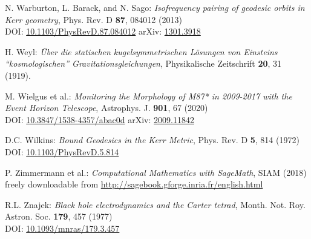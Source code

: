 \begin{thebibliography}{123}
N. Warburton, L. Barack, and N. Sago:
{\em Isofrequency pairing of geodesic orbits in Kerr geometry},
Phys. Rev. D {\bf 87}, 084012 (2013)\\
DOI: \href{https://doi.org/10.1103/PhysRevD.87.084012}{10.1103/PhysRevD.87.084012}\hfill
arXiv: \href{https://arxiv.org/abs/1301.3918}{1301.3918}

H. Weyl: {\em \"Uber die statischen kugelsymmetrischen L\"osungen von Einsteins ``kosmologischen'' Gravitationsgleichungen},
Physikalische Zeitschrift {\bf 20}, 31 (1919).

M. Wielgus et al.:
{\em Monitoring the Morphology of M87* in 2009-2017 with the Event Horizon Telescope},
Astrophys. J. {\bf 901}, 67 (2020)\\
DOI: \href{https://doi.org/10.3847/1538-4357/abac0d}{10.3847/1538-4357/abac0d}\hfill
arXiv: \href{https://arxiv.org/abs/2009.11842}{2009.11842}

D.C. Wilkins:
{\em Bound Geodesics in the Kerr Metric},
Phys. Rev. D {\bf 5}, 814 (1972)\\
DOI: \href{https://doi.org/10.1103/PhysRevD.5.814}{10.1103/PhysRevD.5.814}


P. Zimmermann et al.: {\em Computational Mathematics with SageMath}, SIAM (2018) \\
freely downloadable from \url{http://sagebook.gforge.inria.fr/english.html}

R.L. Znajek:
{\em Black hole electrodynamics and the Carter tetrad},
Month. Not. Roy. Astron. Soc. {\bf 179}, 457 (1977)\\
DOI: \href{https://doi.org/10.1093/mnras/179.3.457}{10.1093/mnras/179.3.457}

\end{thebibliography}
